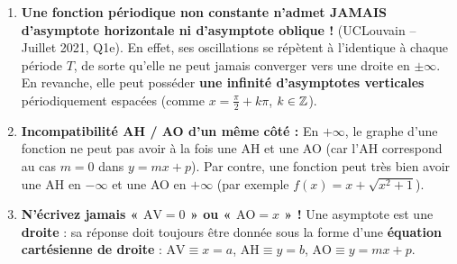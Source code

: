 \begin{attention}
\begin{enumerate}
    \item \textbf{Une fonction périodique non constante n'admet JAMAIS d'asymptote horizontale ni d'asymptote oblique !} (UCLouvain -- Juillet 2021, Q1e). En effet, ses oscillations se répètent à l'identique à chaque période $T$, de sorte qu'elle ne peut jamais converger vers une droite en $\pm\infty$. En revanche, elle peut posséder \textbf{une infinité d'asymptotes verticales} périodiquement espacées (comme $x = \frac{\pi}{2} + k\pi$, $k \in \mathbb{Z}$).
    \item \textbf{Incompatibilité AH / AO d'un même côté :} En $+\infty$, le graphe d'une fonction ne peut pas avoir à la fois une AH et une AO (car l'AH correspond au cas $m=0$ dans $y = mx+p$). Par contre, une fonction peut très bien avoir une AH en $-\infty$ et une AO en $+\infty$ (par exemple $f(x) = x + \sqrt{x^2+1}$).
    \item \textbf{N'écrivez jamais « $\text{AV} = 0$ » ou « $\text{AO} = x$ » !} Une asymptote est une \textbf{droite} : sa réponse doit toujours être donnée sous la forme d'une \textbf{équation cartésienne de droite} : $\text{AV} \equiv x = a$, $\text{AH} \equiv y = b$, $\text{AO} \equiv y = mx + p$.
\end{enumerate}
\end{attention}

